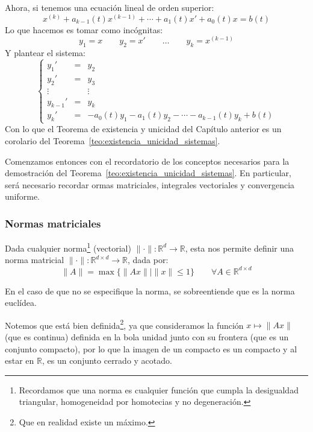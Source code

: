 \begin{coro}
Ahora, si tenemos una ecuación lineal de orden superior:
\begin{equation*}
    x^{(k)} + a_{k-1}(t) x^{(k-1)} + \cdots + a_1(t)x' + a_0(t)x = b(t)
\end{equation*}
Lo que hacemos es tomar como incógnitas:
\begin{equation*}
    y_1 = x \qquad y_2 = x' \qquad \ldots \qquad y_k = x^{(k-1)}
\end{equation*}
Y plantear el sistema:
\begin{equation*}
    \left\{\begin{array}{rcl}
            y_1' &=& y_2 \\
            y_2' &=& y_3 \\
            \vdots && \vdots \\
            y_{k-1}' &=& y_k \\
            y_k' &=& -a_0(t)y_1 -a_1(t) y_2 - \cdots - a_{k-1}(t)y_k + b(t)
    \end{array}\right.
\end{equation*}
Con lo que el Teorema de existencia y unicidad del Capítulo anterior es un corolario del Teorema~\ref{teo:existencia_unicidad_sistemas}.
\end{coro}

Comenzamos entonces con el recordatorio de los conceptos necesarios para la demostración del Teorema~\ref{teo:existencia_unicidad_sistemas}. En particular, será necesario recordar ormas matriciales, integrales vectoriales y convergencia uniforme.
\subsubsection{Normas matriciales}
Dada cualquier norma\footnote{Recordamos que una norma es cualquier función que cumpla la desigualdad triangular, homogeneidad por homotecias y no degeneración.} (vectorial) $\|\cdot \|:\mathbb{R}^d\rightarrow\mathbb{R}$, esta nos permite definir una norma matricial $\|\cdot \|:\mathbb{R}^{d\times d}\rightarrow\mathbb{R}$, dada por:
\begin{equation*}
    \|A\| = \max\{\|Ax\| \mid \|x\|\leq 1\} \qquad \forall A\in \mathbb{R}^{d\times d}
\end{equation*}
\begin{observacion}
    En el caso de que no se especifique la norma, se sobreentiende que es la norma euclídea.
\end{observacion}
Notemos que está bien definida\footnote{Que en realidad existe un máximo.}, ya que consideramos la función $x\longmapsto \|Ax\|$ (que es continua) definida en la bola unidad junto con su frontera (que es un conjunto compacto), por lo que la imagen de un compacto es un compacto y al estar en $\mathbb{R}$, es un conjunto cerrado y acotado.\\

